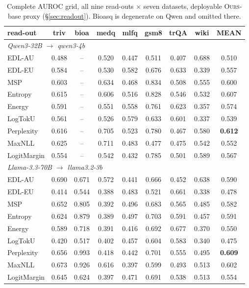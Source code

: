 \documentclass[11pt]{article}
\newcommand{\ours}{\textsc{Ours}}
\newcommand{\best}[1]{\textbf{#1}}
\begin{document}
\begin{table}[t]\centering\small
\setlength{\tabcolsep}{2.6pt}
\begin{tabular}{l ccccccc c}
\toprule
read-out & triv & bioa & medq & mlfq & gsm8 & trQA & wiki & \best{MEAN}\\
\midrule
\multicolumn{9}{l}{\emph{Qwen3-32B $\to$ qwen3-4b}}\\
EDL-AU      & 0.488 & -- & 0.520 & 0.447 & 0.511 & 0.407 & 0.688 & 0.510\\
EDL-EU      & 0.584 & -- & 0.530 & 0.582 & 0.676 & 0.633 & 0.339 & 0.557\\
MSP         & 0.603 & -- & 0.634 & 0.468 & 0.834 & 0.508 & 0.555 & 0.600\\
Entropy     & 0.615 & -- & 0.606 & 0.516 & 0.828 & 0.546 & 0.532 & 0.607\\
Energy      & 0.591 & -- & 0.551 & 0.558 & 0.761 & 0.623 & 0.357 & 0.574\\
LogTokU     & 0.561 & -- & 0.526 & 0.579 & 0.633 & 0.601 & 0.337 & 0.539\\
Perplexity  & 0.616 & -- & 0.705 & 0.523 & 0.780 & 0.467 & 0.580 & \best{0.612}\\
MaxNLL      & 0.625 & -- & 0.711 & 0.483 & 0.477 & 0.475 & 0.542 & 0.552\\
LogitMargin & 0.554 & -- & 0.542 & 0.432 & 0.785 & 0.501 & 0.589 & 0.567\\
\midrule
\multicolumn{9}{l}{\emph{Llama-3.3-70B $\to$ llama3.2-3b}}\\
EDL-AU      & 0.690 & 0.671 & 0.572 & 0.441 & 0.666 & 0.452 & 0.638 & 0.590\\
EDL-EU      & 0.414 & 0.544 & 0.388 & 0.483 & 0.521 & 0.661 & 0.338 & 0.478\\
MSP         & 0.652 & 0.805 & 0.392 & 0.496 & 0.683 & 0.565 & 0.485 & 0.582\\
Entropy     & 0.624 & 0.879 & 0.389 & 0.497 & 0.703 & 0.591 & 0.457 & 0.591\\
Energy      & 0.589 & 0.718 & 0.391 & 0.416 & 0.692 & 0.677 & 0.370 & 0.550\\
LogTokU     & 0.420 & 0.517 & 0.402 & 0.457 & 0.604 & 0.583 & 0.340 & 0.475\\
Perplexity  & 0.656 & 0.993 & 0.418 & 0.442 & 0.701 & 0.555 & 0.495 & \best{0.609}\\
MaxNLL      & 0.673 & 0.926 & 0.616 & 0.397 & 0.599 & 0.493 & 0.513 & 0.602\\
LogitMargin & 0.645 & 0.624 & 0.397 & 0.471 & 0.691 & 0.538 & 0.513 & 0.554\\
\bottomrule
\end{tabular}
\caption{Complete AUROC grid, all nine read-outs $\times$ seven datasets, deployable
\ours-base proxy (\S\ref{sec:readout}). Bioasq is degenerate on Qwen and omitted there.}
\label{tab:app-readout}
\end{table}
\end{document}
